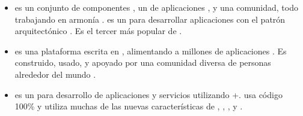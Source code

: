 \begin{itemize}
			\item
				\textbf{\symfonyNAME} es un conjunto de componentes \phpNAME, un \frameworkPC de aplicaciones \webINT, y una comunidad, todo trabajando en armonía \cite{online_technology_officialsite_symfony}. \symfonyNAME es un \softwarePC \freePC para desarrollar aplicaciones con el patrón arquitectónico \mvcAS. Es el tercer \frameworkPC más popular de \phpNAME \cite{online_popularity_php_proyects}.
			\item
				\textbf{\drupalNAME} es una plataforma \openSourcePC \contentManagementCOM escrita en \phpNAME, alimentando a millones de aplicaciones \websitesINT. Es construido, usado, y apoyado por una comunidad diversa de personas alrededor del mundo \cite{online_drupal_official_site}.
			\item
				\textbf{\zendNAME {}} es un \openSourcePC \frameworkPC para desarrollo de aplicaciones \webINT y servicios utilizando +. \zendNAME {} usa código 100\% \objectOrientedPL y utiliza muchas de las nuevas características de , \namelyNamespacesPL, \lateStaticBindPL, \lambdaFuncPL y \closuresPL \cite{online_zend_framework}.

\end{itemize}
